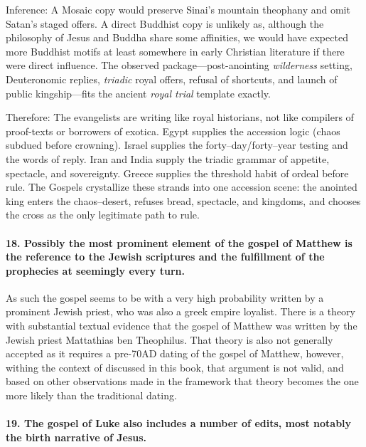 Inference:
A Mosaic copy would preserve Sinai’s mountain theophany and omit Satan’s staged offers.
A direct Buddhist copy is unlikely as, although the philosophy of Jesus and Buddha share some affinities, we would have expected more Buddhist motifs at least somewhere in early Christian literature if there were direct influence.
The observed package—post-anointing \emph{wilderness} setting, Deuteronomic replies, \emph{triadic} royal offers, refusal of shortcuts, and launch of public kingship—fits the ancient \emph{royal trial} template exactly.

Therefore:
The evangelists are writing like royal historians, not like compilers of proof-texts or borrowers of exotica.
Egypt supplies the accession logic (chaos subdued before crowning).
Israel supplies the forty–day/forty–year testing and the words of reply.
Iran and India supply the triadic grammar of appetite, spectacle, and sovereignty.
Greece supplies the threshold habit of ordeal before rule.
The Gospels crystallize these strands into one accession scene: the anointed king enters the chaos–desert, refuses bread, spectacle, and kingdoms, and chooses the cross as the only legitimate path to rule.

\paragraph{18.
Possibly the most prominent element of the gospel of Matthew is the reference to the Jewish scriptures and the fulfillment of the prophecies at seemingly every turn.}\label{par:possibly-the-most-prominent-element-of-the-gospel-of-matthew-is-the-reference-to-the-jewish-scriptures-and-the-fulfillment-of-the-prophecies-at-seemingly-every-turn.}

As such the gospel seems to be with a very high probability written by a prominent Jewish priest, who was also a greek empire loyalist.
There is a theory with substantial textual evidence that the gospel of Matthew was written by the Jewish priest Mattathias ben Theophilus.
That theory is also not generally accepted as it requires a pre-70AD dating of the gospel of Matthew, however, withing the context of discussed in this book, that argument is not valid, and based on other observations made in the framework that theory becomes the one more likely than the traditional dating.

\paragraph{19.
The gospel of Luke also includes a number of edits, most notably the birth narrative of Jesus.}\label{par:the-gospel-of-luke-also-includes-a-number-of-edits-most-notably-the-birth-narrative-of-jesus.}

